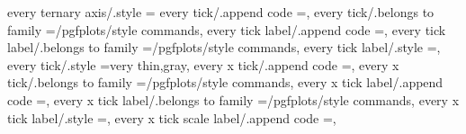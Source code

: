 {{{{{{{{{{{{{{every ternary axis/.style                                          ={                                                                                                                                  
every tick/.append code                                            ={},                                                                                 
every tick/.belongs to family                                      =/pgfplots/style commands,                                                                                                          
every tick label/.append code                                      ={},                                                                           
every tick label/.belongs to family                                =/pgfplots/style commands,                                                                                                          
every tick label/.style                                            ={},                                                                                                                                
every tick/.style                                                  ={very thin,gray},                                                                                                                  
every x tick/.append code                                          ={},                                                                               
every x tick/.belongs to family                                    =/pgfplots/style commands,                                                                                                          
every x tick label/.append code                                    ={},                                                                         
every x tick label/.belongs to family                              =/pgfplots/style commands,                                                                                                          
every x tick label/.style                                          ={},                                                                                                                                
every x tick scale label/.append code                              ={},                                                                   
}}}}}}}}}}}}}}}
